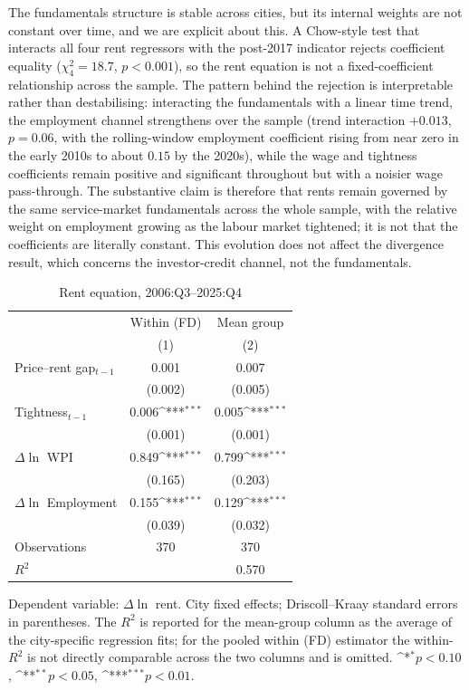 \documentclass[preprint,11pt,authoryear]{elsarticle}
\newcommand{\sym}[1]{\ifmmode^{#1}\else\(^{#1}\)\fi}
\begin{document}
The fundamentals structure is stable across cities, but its internal
weights are not constant over time, and we are explicit about this. A
Chow-style test that interacts all four rent regressors with the
post-2017 indicator rejects coefficient equality
($\chi^2_4 = 18.7$, $p < 0.001$), so the rent equation is not a
fixed-coefficient relationship across the sample. The pattern behind the
rejection is interpretable rather than destabilising: interacting the
fundamentals with a linear time trend, the employment channel
strengthens over the sample (trend interaction $+0.013$, $p = 0.06$, with
the rolling-window employment coefficient rising from near zero in the
early 2010s to about $0.15$ by the 2020s), while the wage and tightness
coefficients remain positive and significant throughout but with a
noisier wage pass-through. The substantive claim is therefore that rents
remain governed by the same service-market fundamentals across the whole
sample, with the relative weight on employment growing as the labour
market tightened; it is not that the coefficients are literally constant.
This evolution does not affect the divergence result, which concerns the
investor-credit channel, not the fundamentals.

\begin{table}[t]
\centering
\begin{threeparttable}
\caption{Rent equation, 2006:Q3--2025:Q4}
\label{tab:rent_eq}
\begin{tabular}{lcc}
\toprule
 & \multicolumn{1}{c}{Within (FD)} & \multicolumn{1}{c}{Mean group} \\
 & (1) & (2) \\
\midrule
Price--rent gap$_{t-1}$ & 0.001 & 0.007 \\
                       & (0.002) & (0.005) \\
Tightness$_{t-1}$      & 0.006\sym{***} & 0.005\sym{***} \\
                       & (0.001) & (0.001) \\
$\Delta\ln$ WPI        & 0.849\sym{***} & 0.799\sym{***} \\
                       & (0.165) & (0.203) \\
$\Delta\ln$ Employment & 0.155\sym{***} & 0.129\sym{***} \\
                       & (0.039) & (0.032) \\
\midrule
Observations           & 370 & 370 \\
$R^2$                  &     & 0.570 \\
\bottomrule
\end{tabular}
\begin{tablenotes}[flushleft]\footnotesize
\item Dependent variable: $\Delta\ln$ rent. City fixed effects; Driscoll--Kraay
standard errors in parentheses. The $R^2$ is reported for the mean-group
column as the average of the city-specific regression fits; for the pooled
within (FD) estimator the within-$R^2$ is not directly comparable across the
two columns and is omitted. \sym{*}$p<0.10$, \sym{**}$p<0.05$,
\sym{***}$p<0.01$.
\end{tablenotes}
\end{threeparttable}
\end{table}
\end{document}
